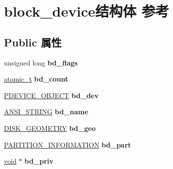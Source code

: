 \hypertarget{structblock__device}{}\section{block\+\_\+device结构体 参考}
\label{structblock__device}
\subsection*{Public 属性}
\begin{DoxyCompactItemize}
\item 
\mbox{\label{structblock__device_a1b7cd7e696d66674b842934ca08ed6b1}} 
unsigned long {\bfseries bd\+\_\+flags}
\item 
\mbox{\label{structblock__device_a70b6bf49d9407b5fd4a872c76b5c7af1}} 
\hyperlink{structatomic__t}{atomic\+\_\+t} {\bfseries bd\+\_\+count}
\item 
\mbox{\label{structblock__device_ad2255d37b8cca180561119418b31db61}} 
\hyperlink{struct___d_e_v_i_c_e___o_b_j_e_c_t}{P\+D\+E\+V\+I\+C\+E\+\_\+\+O\+B\+J\+E\+CT} {\bfseries bd\+\_\+dev}
\item 
\mbox{\label{structblock__device_ae2762d18a79ae8f94dd23080923553d5}} 
\hyperlink{struct___a_n_s_i___s_t_r_i_n_g}{A\+N\+S\+I\+\_\+\+S\+T\+R\+I\+NG} {\bfseries bd\+\_\+name}
\item 
\mbox{\label{structblock__device_aa5524ab53ba513c2bf598ea5cbc938f2}} 
\hyperlink{struct___d_i_s_k___g_e_o_m_e_t_r_y}{D\+I\+S\+K\+\_\+\+G\+E\+O\+M\+E\+T\+RY} {\bfseries bd\+\_\+geo}
\item 
\mbox{\label{structblock__device_a3b14f4dff8ffba1802889cb67fa19668}} 
\hyperlink{struct___p_a_r_t_i_t_i_o_n___i_n_f_o_r_m_a_t_i_o_n}{P\+A\+R\+T\+I\+T\+I\+O\+N\+\_\+\+I\+N\+F\+O\+R\+M\+A\+T\+I\+ON} {\bfseries bd\+\_\+part}
\item 
\mbox{\label{structblock__device_a0960afa165408d37f1e544ec3707cb7c}} 
\hyperlink{interfacevoid}{void} $\ast$ {\bfseries bd\+\_\+priv}
\item 
\mbox{\label{structblock__device_ab6bee2e4acafbcb35429e60c042a3791}} 

\end{DoxyCompactItemize}
